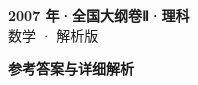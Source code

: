 \documentclass[zihao=-4, a4paper]{ctexart}
\begin{document}
\begin{center}
  {\Large\bfseries 2007 年·全国大纲卷Ⅱ·理科}\\[4pt]
  {\large 数学 · 解析版}
\end{center}
\medskip
{}

\clearpage
{}
\begin{center}{\Large\bfseries 参考答案与详细解析}\end{center}
\medskip

\end{document}
